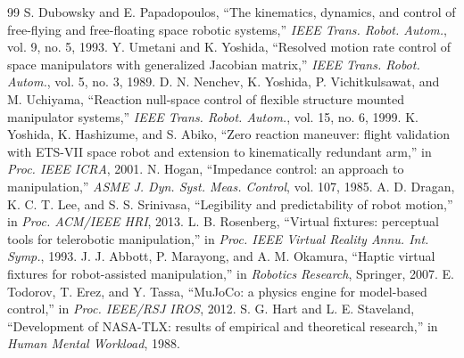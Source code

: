 \documentclass[conference]{IEEEtran}
\begin{document}

\begin{thebibliography}{99}
 S. Dubowsky and E. Papadopoulos, ``The kinematics, dynamics, and control of free-flying and free-floating space robotic systems,'' \emph{IEEE Trans. Robot. Autom.}, vol. 9, no. 5, 1993.
 Y. Umetani and K. Yoshida, ``Resolved motion rate control of space manipulators with generalized Jacobian matrix,'' \emph{IEEE Trans. Robot. Autom.}, vol. 5, no. 3, 1989.
 D. N. Nenchev, K. Yoshida, P. Vichitkulsawat, and M. Uchiyama, ``Reaction null-space control of flexible structure mounted manipulator systems,'' \emph{IEEE Trans. Robot. Autom.}, vol. 15, no. 6, 1999.
 K. Yoshida, K. Hashizume, and S. Abiko, ``Zero reaction maneuver: flight validation with ETS-VII space robot and extension to kinematically redundant arm,'' in \emph{Proc. IEEE ICRA}, 2001.
 N. Hogan, ``Impedance control: an approach to manipulation,'' \emph{ASME J. Dyn. Syst. Meas. Control}, vol. 107, 1985.
 A. D. Dragan, K. C. T. Lee, and S. S. Srinivasa, ``Legibility and predictability of robot motion,'' in \emph{Proc. ACM/IEEE HRI}, 2013.
 L. B. Rosenberg, ``Virtual fixtures: perceptual tools for telerobotic manipulation,'' in \emph{Proc. IEEE Virtual Reality Annu. Int. Symp.}, 1993.
 J. J. Abbott, P. Marayong, and A. M. Okamura, ``Haptic virtual fixtures for robot-assisted manipulation,'' in \emph{Robotics Research}, Springer, 2007.
 E. Todorov, T. Erez, and Y. Tassa, ``MuJoCo: a physics engine for model-based control,'' in \emph{Proc. IEEE/RSJ IROS}, 2012.
 S. G. Hart and L. E. Staveland, ``Development of NASA-TLX: results of empirical and theoretical research,'' in \emph{Human Mental Workload}, 1988.
\end{thebibliography}
\end{document}
